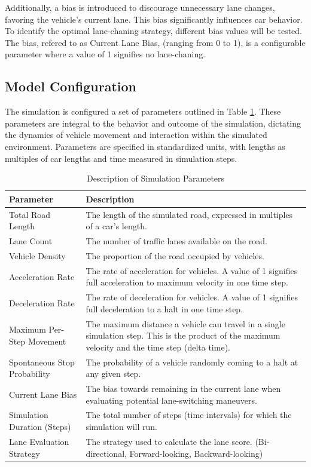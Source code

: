 \documentclass{article}
\begin{document}
Additionally, a bias is introduced to discourage unnecessary lane changes, favoring the vehicle's current lane. This bias significantly influences car behavior. To identify the optimal lane-chaning strategy, different bias values will be tested. The bias, refered to as Current Lane Bias, (ranging from 0 to 1), is a configurable parameter where a value of 1 signifies no lane-chaning.

\subsection{Model Configuration}
The simulation is configured a set of parameters outlined in Table \ref{table:run_config}. These parameters are integral to the behavior and outcome of the simulation, dictating the dynamics of vehicle movement and interaction within the simulated environment. Parameters are specified in standardized units, with lengths as multiples of car lengths and time measured in simulation steps.

\begin{table}[H]
\centering
\begin{tabular}{|l|p{6cm}|}
\hline
\textbf{Parameter}            & \textbf{Description} \\
\hline
Total Road Length             & \small{The length of the simulated road, expressed in multiples of a car's length.} \\
\hline
Lane Count                    & \small{The number of traffic lanes available on the road.} \\
\hline
Vehicle Density               & \small{The proportion of the road occupied by vehicles.} \\
\hline
Acceleration Rate             & \small{The rate of acceleration for vehicles. A value of 1 signifies full acceleration to maximum velocity in one time step.} \\
\hline
Deceleration Rate             & \small{The rate of deceleration for vehicles. A value of 1 signifies full deceleration to a halt in one time step.} \\
\hline
Maximum Per-Step Movement     & \small{The maximum distance a vehicle can travel in a single simulation step. This is the product of the maximum velocity and the time step (delta time).} \\
\hline
Spontaneous Stop Probability  & \small{The probability of a vehicle randomly coming to a halt at any given step.} \\
\hline
Current Lane Bias             & \small{The bias towards remaining in the current lane when evaluating potential lane-switching maneuvers.} \\
\hline
Simulation Duration (Steps)   & \small{The total number of steps (time intervals) for which the simulation will run.} \\
\hline
Lane Evaluation Strategy   & \small{The strategy used to calculate the lane score. (Bi-directional, Forward-looking, Backward-looking)} \\
\hline
\end{tabular}
\caption{Description of Simulation Parameters}
\label{table:run_config}
\end{table}
\end{document}
